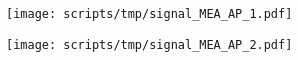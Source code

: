 \begin{frame}{}
    \begin{figure}[H]
        \centering
        \begin{subfigure}[b]{0.485\textwidth}
            \centering
            \texttt{[image: scripts/tmp/signal\_MEA\_AP\_1.pdf]}
            \caption{}
        \end{subfigure}
        \begin{subfigure}[b]{0.485\textwidth}
            \centering
            \texttt{[image: scripts/tmp/signal\_MEA\_AP\_2.pdf]}
            \caption{}
        \end{subfigure}     
    \end{figure}
\end{frame}

